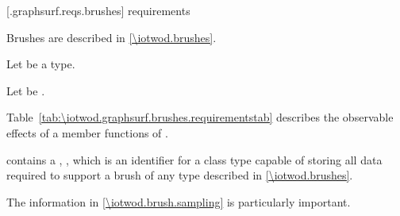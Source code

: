 
 [\iotwod.graphsurf.reqs.brushes]{ requirements}

\pnum
Brushes are described in \ref{\iotwod.brushes}.

\pnum
Let  be a \graphicssurfacestemplparam type.

\pnum
Let  be .

\pnum
Table~\ref{tab:\iotwod.graphsurf.brushes.requirementstab} describes the observable effects of a member functions of .

\pnum
{} contains a , 
, which is an identifier for a class type capable of
storing all data required to support a brush of any type described in
\ref{\iotwod.brushes}. \begin{note}
The information in \ref{\iotwod.brush.sampling} is particularly important.
\end{note}

